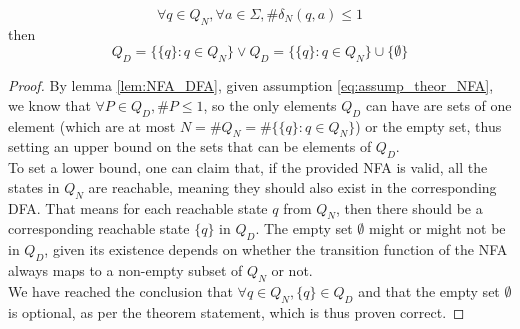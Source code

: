 \documentclass[docid=TP03]{tcom_TP}
\begin{document}
{\begin{theorem}
\begin{equation}
		\forall q \in Q_N, \forall a \in \Sigma, \#\delta_N(q,a)\leq 1
	\end{equation}
	then
	\begin{equation}
		Q_D=\{\{q\}:q\in Q_N\} \vee Q_D=\{\{q\}:q\in Q_N\} \cup \{\emptyset\}
	\end{equation}
\end{theorem}
\begin{proof}
	By lemma \ref{lem:NFA_DFA}, given assumption \eqref{eq:assump_theor_NFA}, we know that $\forall P \in Q_D, \#P \leq 1$, so the only elements $Q_D$ can have are sets of one element (which are at most $N = \#Q_N=\#\{\{q\}:q\in Q_N\}$) or the empty set, thus setting an upper bound on the sets that can be elements of $Q_D$.\\
	To set a lower bound, one can claim that, if the provided NFA is valid, all the states in $Q_N$ are reachable, meaning they should also exist in the corresponding DFA. That means for each reachable state $q$ from $Q_N$, then there should be a corresponding reachable state $\{q\}$ in $Q_D$. The empty set $\emptyset$ might or might not be in $Q_D$, given its existence depends on whether the transition function of the NFA always maps to a non-empty subset of $Q_N$ or not.\\
	We have reached the conclusion that $\forall q \in Q_N, \{q\} \in Q_D$ and that the empty set $\emptyset$ is optional, as per the theorem statement, which is thus proven correct.
\end{proof}
}
\end{document}
